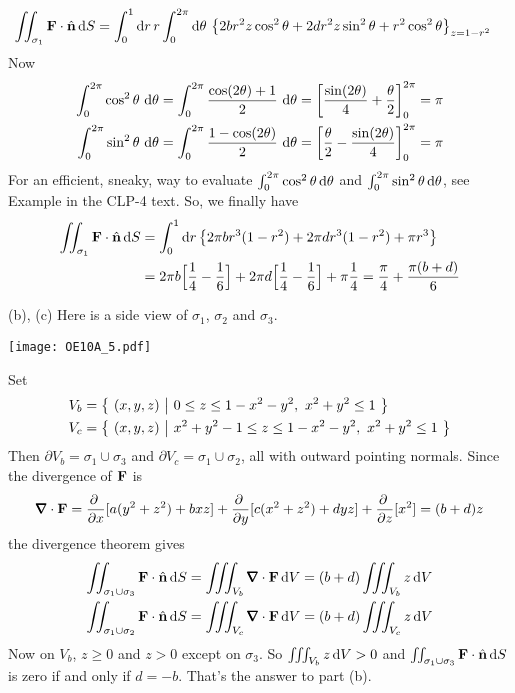 \begin{solution}
\begin{align*}
\dblInt_{\sigma_1} \vF\cdot\hn\,\dee{S}
&=\int_0^1\dee{r}\, r\int_0^{2\pi}\dee{\theta}\ 
         \big\{ 2br^2z\cos^2\theta  +2 dr^2z\sin^2\theta 
                     + r^2\cos^2\theta\big\}_{z=1 - r^2}
\end{align*}
Now
\begin{align*}
\int_0^{2\pi}\cos^2\theta\ \mathrm{d}\theta
&=\int_0^{2\pi}\frac{\cos(2\theta)+1}{2}\ \mathrm{d}\theta
=\left[\frac{\sin(2\theta)}{4}+\frac{\theta}{2}\right]_0^{2\pi}
=\pi
\\
\int_0^{2\pi}\sin^2\theta\ \mathrm{d}\theta
&=\int_0^{2\pi}\frac{1-\cos(2\theta)}{2}\ \mathrm{d}\theta
=\left[\frac{\theta}{2}-\frac{\sin(2\theta)}{4}\right]_0^{2\pi}
=\pi
\end{align*}
For an efficient, sneaky, way to evaluate 
$\int_0^{2\pi} \cos^2\theta\,\mathrm{d}\theta$ 
and $\int_0^{2\pi} \sin^2\theta\,\mathrm{d}\theta$,
see Example
 in the CLP-4 text.
So, we finally have
\begin{align*}
\iint_{\sigma_1} \mathbf{F}\cdot\hat{\mathbf{n}}\,\mathrm{d}S
&=\int_0^1\mathrm{d}r\,  
         \big\{ 2\pi br^3(1-r^2)  +2\pi dr^3(1-r^2) 
                     + \pi r^3\big\} \\
&=2\pi b\Big[\frac{1}{4}-\frac{1}{6}\Big]
  +2\pi d\Big[\frac{1}{4}-\frac{1}{6}\Big]
  +\pi\frac{1}{4}
=\frac{\pi}{4} +\frac{\pi(b+d)}{6}
\end{align*}

(b), (c) Here is a side view of $\sigma_1$, $\sigma_2$ and $\sigma_3$.
\begin{center}
  \texttt{[image: OE10A\_5.pdf]}
\end{center}
Set
\begin{align*}
V_b &=\big\{ \ (x,y,z)\ \big|\ 0\le z \le 1-x^2-y^2,\ x^2+y^2\le 1\ \big\} \\
V_c &=\big\{ \ (x,y,z)\ \big|\ x^2+y^2-1 \le z \le 1-x^2-y^2,\ x^2+y^2\le 1\ \big\} 
\end{align*}
Then $\partial V_b = \sigma_1\cup\sigma_3$ and 
     $\partial V_c = \sigma_1\cup\sigma_2$,
all with outward pointing normals. Since the divergence of $\mathbf{F}$ is
\begin{equation*}
\vnabla\cdot\vF = 
  \pdiff{}{x}[ a ( y^2 + z^2 ) + bxz ]
  +\pdiff{}{y}[ c ( x^2 + z^2 ) + dyz ]
  +\pdiff{}{z}[ x^2]
= (b+d) z
\end{equation*}
the divergence theorem gives
\begin{align*}
\dblInt_{\sigma_1\cup\sigma_3} \vF\cdot\hn\,\dee{S}
   & = \tripInt_{V_b} \vnabla\cdot\vF\,\dee{V}
     = (b+d)\tripInt_{V_b} z\,\dee{V} \\
\dblInt_{\sigma_1\cup\sigma_2} \vF\cdot\hn\,\dee{S}
   & = \tripInt_{V_c} \vnabla\cdot\vF\,\dee{V}
     = (b+d)\tripInt_{V_c} z\,\dee{V} \\
\end{align*}
Now on $V_b$, $z\ge 0$ and $z>0$ except on $\sigma_3$. So 
$\iiint_{V_b} z\,\mathrm{d}V>0$ and 
$\iint_{\sigma_1\cup\sigma_3} \mathbf{F}\cdot\hat{\mathbf{n}}\,\mathrm{d}S$ is zero if and only if 
$d=-b$. That's the answer to part (b).



\end{solution}
